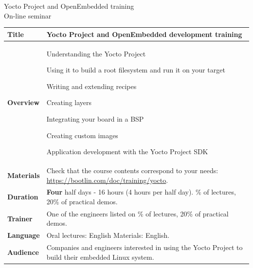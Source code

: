 \documentclass[a4paper,12pt,obeyspaces,spaces,hyphens]{article}
\begin{document}
\setlength{\arrayrulewidth}{0.8pt}

\begin{center}
\LARGE
Yocto Project and OpenEmbedded training\\
\large
On-line seminar
\end{center}
\vspace{1cm}

\small
{}

 {
  \begin{tabularx}{\textwidth}{|g|h|}
    {\bf Title} & {\bf Yocto Project and OpenEmbedded development training} \\
    \hline

    {\bf Overview} &
    Understanding the Yocto Project \par
    Using it to build a root filesystem and run it on your target \par
    Writing and extending recipes \par
    Creating layers \par
    Integrating your board in a BSP \par
    Creating custom images \par
    Application development with the Yocto Project SDK \\
    \hline
    {\bf Materials} &
    Check that the course contents correspond to your needs:
    \newline \url{https://bootlin.com/doc/training/yocto}. \\
    \hline

    {\bf Duration} & {\bf Four} half days - 16 hours (4 hours per half day).
    \% of lectures, 20\% of practical demos. \\
    \hline

    {\bf Trainer} & One of the engineers listed on
    \% of lectures, 20\% of practical demos. \\
    \hline

    {\bf Language} & Oral lectures: English
    \newline Materials: English.\\
    \hline

    {\bf Audience} & Companies and engineers interested in using
    the Yocto Project to build their embedded Linux system.\\
    \hline


\end{tabularx}}
\end{document}
